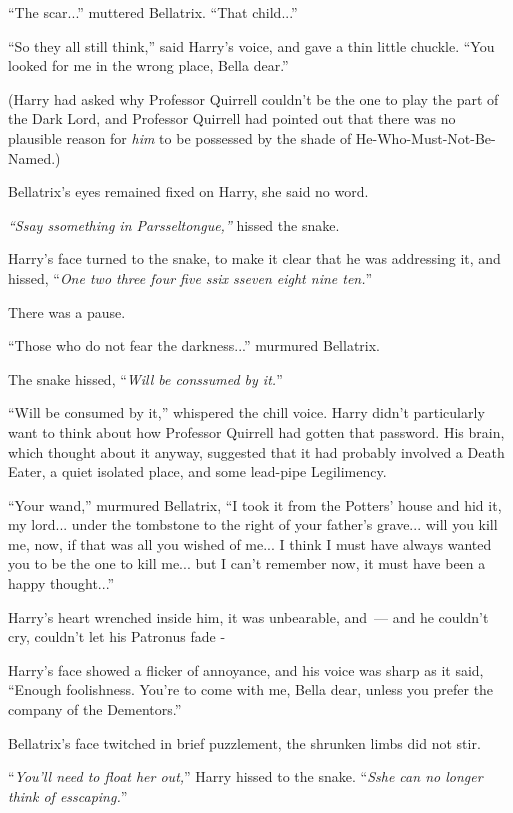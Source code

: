 ``The scar...'' muttered Bellatrix. ``That child...''

``So they all still think,'' said Harry's voice, and gave a thin little chuckle. ``You looked for me in the wrong place, Bella dear.''

(Harry had asked why Professor Quirrell couldn't be the one to play the part of the Dark Lord, and Professor Quirrell had pointed out that there was no plausible reason for \emph{him} to be possessed by the shade of He-Who-Must-Not-Be-Named.)

Bellatrix's eyes remained fixed on Harry, she said no word.

\emph{``Ssay ssomething in Parsseltongue,''} hissed the snake.

Harry's face turned to the snake, to make it clear that he was addressing it, and hissed, ``\emph{One two three four five ssix sseven eight nine ten.}''

There was a pause.

``Those who do not fear the darkness...'' murmured Bellatrix.

The snake hissed, ``\emph{Will be conssumed by it.}''

``Will be consumed by it,'' whispered the chill voice. Harry didn't particularly want to think about how Professor Quirrell had gotten that password. His brain, which thought about it anyway, suggested that it had probably involved a Death Eater, a quiet isolated place, and some lead-pipe Legilimency.

``Your wand,'' murmured Bellatrix, ``I took it from the Potters' house and hid it, my lord... under the tombstone to the right of your father's grave... will you kill me, now, if that was all you wished of me... I think I must have always wanted you to be the one to kill me... but I can't remember now, it must have been a happy thought...''

Harry's heart wrenched inside him, it was unbearable, and~--- and he couldn't cry, couldn't let his Patronus fade -

Harry's face showed a flicker of annoyance, and his voice was sharp as it said, ``Enough foolishness. You're to come with me, Bella dear, unless you prefer the company of the Dementors.''

Bellatrix's face twitched in brief puzzlement, the shrunken limbs did not stir.

``\emph{You'll need to float her out,}'' Harry hissed to the snake. ``\emph{Sshe can no longer think of esscaping.}''

